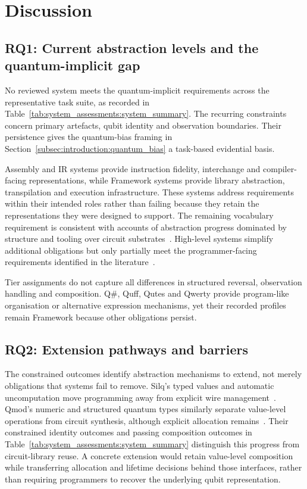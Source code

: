\section{Discussion}\label{sec:discussion}

\subsection{RQ1: Current abstraction levels and the quantum-implicit gap}\label{subsec:discussion:rq1}
No reviewed system meets the quantum-implicit requirements across the representative task suite, as recorded in Table~\ref{tab:system_assessments:system_summary}.
The recurring constraints concern primary artefacts, qubit identity and observation boundaries.
Their persistence gives the quantum-bias framing in Section~\ref{subsec:introduction:quantum_bias} a task-based evidential basis.

Assembly and IR systems provide instruction fidelity, interchange and compiler-facing representations, while Framework systems provide library abstraction, transpilation and execution infrastructure.
These systems address requirements within their intended roles rather than failing because they retain the representations they were designed to support.
The remaining vocabulary requirement is consistent with accounts of abstraction progress dominated by structure and tooling over circuit substrates~\cite{corralesgarro2025productivityexpressiveness,furntratt2024higherabstractionlevels}.
High-level systems simplify additional obligations but only partially meet the programmer-facing requirements identified in the literature~\cite{DiMatteo2024AbstractionHierarchy,nunez_corrales2025betterabstractmachines}.

Tier assignments do not capture all differences in structured reversal, observation handling and composition.
Q\#, Quff, Qutes and Qwerty provide program-like organisation or alternative expression mechanisms, yet their recorded profiles remain Framework because other obligations persist.

\subsection{RQ2: Extension pathways and barriers}\label{subsec:discussion:rq2}
The constrained outcomes identify abstraction mechanisms to extend, not merely obligations that systems fail to remove.
Silq's typed values and automatic uncomputation move programming away from explicit wire management~\cite{bichsel2020silq}.
Qmod's numeric and structured quantum types similarly separate value-level operations from circuit synthesis, although explicit allocation remains~\cite{vax2025qmodexpressivehighlevelquantum}.
Their constrained identity outcomes and passing composition outcomes in Table~\ref{tab:system_assessments:system_summary} distinguish this progress from circuit-library reuse.
A concrete extension would retain value-level composition while transferring allocation and lifetime decisions behind those interfaces, rather than requiring programmers to recover the underlying qubit representation.

